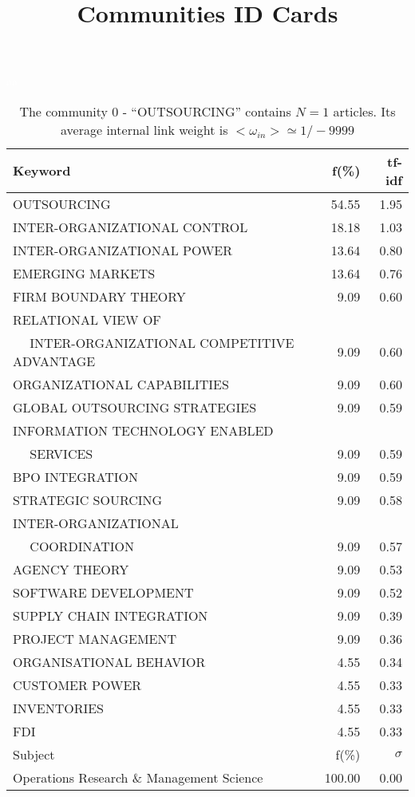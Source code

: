 \documentclass[a4paper,11pt]{report}
\title{{\bf Communities ID Cards}}
\date{\begin{flushleft}This document gather the ``ID Cards'' of the CC communities found within your database.\\
 The CC network was built by keeping a link between articles sharing at least 5 references. The communities characterized here correspond to the ones found in the level 0 (in the sense of the Louvain algo) which gathers more than 0 articles.\\
 These ID cards displays the most frequent keywords, subject categories, journals of publication, institution, countries, authors, references and reference journals of the articles of each community. The significance of an item $\sigma = \sqrt{N} (f - p) / \sqrt{p(1-p)}$ [where $N$ is the number of articles within the community and $f$ and $p$ are the proportion of articles respectively within the community and within the database displaying that item ] is also given (for example $\sigma > 5$ is really highly significant). The tf-idf value which can be calculated by $tf-idf = f*log(frac{1}{p})$ is also given.\\
\vspace{1cm}
\copyright Sebastian Grauwin, Liu Weizhi - (2014) \end{flushleft}}
\begin{document}
\begin{landscape}
\maketitle
\clearpage

\begin{table}[!ht]
\caption{The community 0 - ``OUTSOURCING'' contains $N = 1$ articles. Its average internal link weight is $<\omega_{in}> \simeq 1/-9999$ }
\textcolor{white}{aa}\\
{\scriptsize\begin{tabular}{|l r  r|}
\hline
Keyword & f(\%) & tf-idf \\
\hline
OUTSOURCING & 54.55 & 1.95\\
INTER-ORGANIZATIONAL CONTROL & 18.18 & 1.03\\
INTER-ORGANIZATIONAL POWER & 13.64 & 0.80\\
EMERGING MARKETS & 13.64 & 0.76\\
FIRM BOUNDARY THEORY & 9.09 & 0.60\\
RELATIONAL VIEW OF &  &\\
$\quad$ INTER-ORGANIZATIONAL COMPETITIVE ADVANTAGE & 9.09 & 0.60\\
ORGANIZATIONAL CAPABILITIES & 9.09 & 0.60\\
GLOBAL OUTSOURCING STRATEGIES & 9.09 & 0.59\\
INFORMATION TECHNOLOGY ENABLED &  &\\
$\quad$ SERVICES & 9.09 & 0.59\\
BPO INTEGRATION & 9.09 & 0.59\\
STRATEGIC SOURCING & 9.09 & 0.58\\
INTER-ORGANIZATIONAL &  &\\
$\quad$ COORDINATION & 9.09 & 0.57\\
AGENCY THEORY & 9.09 & 0.53\\
SOFTWARE DEVELOPMENT & 9.09 & 0.52\\
SUPPLY CHAIN INTEGRATION & 9.09 & 0.39\\
PROJECT MANAGEMENT & 9.09 & 0.36\\
ORGANISATIONAL BEHAVIOR & 4.55 & 0.34\\
CUSTOMER POWER & 4.55 & 0.33\\
INVENTORIES & 4.55 & 0.33\\
FDI & 4.55 & 0.33\\
\hline
\hline
Subject & f(\%) & $\sigma$\\
\hline
Operations Research \& Management Science & 100.00 & 0.00\\

\end{tabular}}
\end{table}
\end{landscape}
\end{document}

